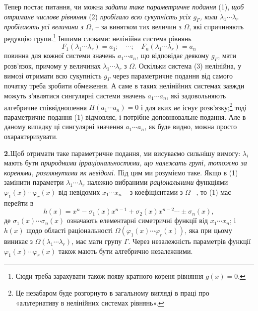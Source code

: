 \documentclass[11pt]{article}
\begin{document}
Тепер постає питання, чи можна \emph{задати таке параметричне подання} (1), \emph{щоб отримане числове рівняння} (2) \emph{пробігало всю сукупність усіх $g_\Gamma$, коли $\lambda_1\cdots\lambda_r$ пробігають усі величини з $\Omega$}, -- за винятком тих величин з $\Omega$, які спричиняють редукцію групи.\footnote{Сюди треба зарахувати також появу кратного кореня рівняння $g(x)=0$.} Іншими словами: нелінійна система рівнянь
\begin{equation}
 F_1(\lambda_1\cdots\lambda_r)=a_1;\quad \cdots;\quad F_n(\lambda_1\cdots\lambda_r)=a_n
\tag{3}
\end{equation}
повинна для кожної системи значень $a_1\cdots a_n$, що відповідає деякому $g_\Gamma$, мати розв'язок, причому у величинах $\lambda_1\cdots\lambda_r$ з $\Omega$. Оскільки система (3) нелінійна, у вимозі отримати всю сукупність $g_\Gamma$ через параметричне подання від самого початку треба зробити обмеження. А саме в таких нелінійних системах завжди можуть з'являтися сингулярні системи значень $a_1\cdots a_n$, які задовольняють алгебричне співвідношення $H(a_1\cdots a_n)=0$ і для яких \emph{не} існує розв'язку;\footnote{Це незабаром буде розгорнуто в загальному вигляді в праці про «альтернативу в нелінійних системах рівнянь».} тоді параметричне подання (1) відмовляє, і потрібне доповнювальне подання. Але в даному випадку ці сингулярні значення $a_1\cdots a_n$, як буде видно, можна просто охарактеризувати.

\noindent\textbf{2.}\quad Щоб отримати таке параметричне подання, ми висуваємо сильнішу вимогу: $\lambda_i$ мають бути \emph{природними ірраціональностями, що належать групі, тотожно за коренями, розглянутими як невідомі}. Під цим ми розуміємо таке. Якщо в (1) замінити параметри $\lambda_1\cdots\lambda_r$ належно вибраними \emph{раціональними} функціями $\varphi_1(x)\cdots\varphi_r(x)$ від невідомих $x_1\cdots x_n$ -- з коефіцієнтами з $\Omega$ --, то (1) має перейти в
\begin{equation}
 h(x)=x^n-\sigma_1(x)x^{n-1}+\sigma_2(x)x^{n-2}\cdots\pm\sigma_n(x),
\tag{4}
\end{equation}
де $\sigma_1(x)\cdots\sigma_n(x)$ означають елементарні симетричні функції від $x_1\cdots x_n$; і $h(x)$ щодо області раціональності $\Omega(\varphi_1(x)\cdots\varphi_r(x))$, яка при цьому виникає з $\Omega(\lambda_1\cdots\lambda_r)$, має мати групу $\Gamma$. Через незалежність параметрів функції $\varphi_1(x)\cdots\varphi_r(x)$ також мають бути алгебрично незалежними.
\end{document}
